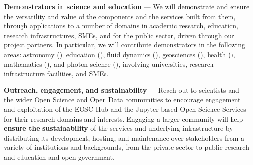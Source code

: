 \begin{compactenum}
\item \label{obj:demonstrators}
  \textbf{Demonstrators in science and education} ---
  We will demonstrate and ensure the versatility and value of the components and
  the services built from them,
  through applications to a number of
  domains in academic research, education, research infrastructures, SMEs, and for
  the public sector, driven through our project partners. In
  particular, we will contribute demonstrators in the following areas:
  astronomy (), education
  (), fluid dynamics
  (), geosciences
  (), health
  (), mathematics
  (),
  and photon science (),
  involving universities, research infrastructure facilities, and SMEs.

\item \label{obj:outreach-and-engagement}
  \textbf{Outreach, engagement, and sustainability} ---
  Reach out to scientists and the wider Open Science and Open Data
  communities to encourage engagement
  and exploitation of the EOSC-Hub and the Jupyter-based Open Science
  Services for their research domains and interests.
  Engaging a larger community will help \textbf{ensure the sustainability} of
  the services and underlying infrastructure by distributing its
  development, hosting, and maintenance over stakeholders from a
  variety of institutions and backgrounds,
  from the private sector to public research and education
  and open government.

\end{compactenum}

